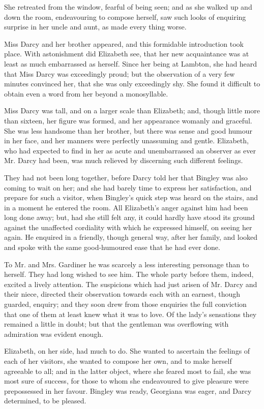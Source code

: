 She retreated from the window, fearful of being seen;
and as she walked up and down the room, endeavouring
to compose herself, saw such looks of enquiring surprise
in her uncle and aunt, as made every thing worse.

Miss Darcy and her brother appeared, and this formidable
introduction took place. With astonishment did
Elizabeth see, that her new acquaintance was at least
as much embarrassed as herself. Since her being at
Lambton, she had heard that Miss Darcy was exceedingly
proud; but the observation of a very few minutes convinced
her, that she was only exceedingly shy. She found
it difficult to obtain even a word from her beyond a
monosyllable.

Miss Darcy was tall, and on a larger scale than Elizabeth;
and, though little more than sixteen, her figure
was formed, and her appearance womanly and graceful.
She was less handsome than her brother, but there was
sense and good humour in her face, and her manners were
perfectly unassuming and gentle. Elizabeth, who had
expected to find in her as acute and unembarrassed an
observer as ever Mr. Darcy had been, was much relieved
by discerning such different feelings.

They had not been long together, before Darcy told her
that Bingley was also coming to wait on her; and she
had barely time to express her satisfaction, and prepare
for such a visitor, when Bingley’s quick step was heard
on the stairs, and in a moment he entered the room. All
Elizabeth’s anger against him had been long done away;
but, had she still felt any, it could hardly have stood its
ground against the unaffected cordiality with which he
expressed himself, on seeing her again. He enquired in
a friendly, though general way, after her family, and looked
and spoke with the same good-humoured ease that he had
ever done.

To Mr. and Mrs. Gardiner he was scarcely a less interesting
personage than to herself. They had long wished to
see him. The whole party before them, indeed, excited
a lively attention. The suspicions which had just arisen
of Mr. Darcy and their niece, directed their observation
towards each with an earnest, though guarded, enquiry;
and they soon drew from those enquiries the full conviction
that one of them at least knew what it was to love. Of
the lady’s sensations they remained a little in doubt;
but that the gentleman was overflowing with admiration
was evident enough.

Elizabeth, on her side, had much to do. She wanted
to ascertain the feelings of each of her visitors, she wanted
to compose her own, and to make herself agreeable to all;
and in the latter object, where she feared most to fail,
she was most sure of success, for those to whom she
endeavoured to give pleasure were prepossessed in her
favour. Bingley was ready, Georgiana was eager, and
Darcy determined, to be pleased.

